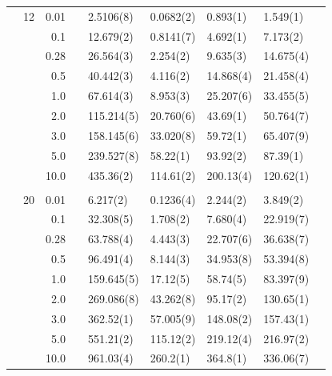 \begin{table}[H]
\begin{tabularx}{\textwidth}{R{1cm}rrcR{2.3cm}R{2.3cm}R{2.3cm}R{2.3cm}R{1cm}}
		&12 & 0.01 && 2.5106(8) & 0.0682(2) & 0.893(1) & 1.549(1) \\
		&& 0.1 && 12.679(2) & 0.8141(7) & 4.692(1) & 7.173(2) \\
		&& 0.28 && 26.564(3) & 2.254(2) & 9.635(3) & 14.675(4) \\
		&& 0.5 && 40.442(3) & 4.116(2) & 14.868(4) & 21.458(4) \\
		&& 1.0 && 67.614(3) & 8.953(3) & 25.207(6) & 33.455(5) \\
		&& 2.0 && 115.214(5) & 20.760(6) & 43.69(1) & 50.764(7) \\
		&& 3.0 && 158.145(6) & 33.020(8) & 59.72(1) & 65.407(9) \\ 
		&& 5.0 && 239.527(8) & 58.22(1) & 93.92(2) & 87.39(1) \\
		&& 10.0 && 435.36(2) & 114.61(2) & 200.13(4) & 120.62(1) \\
		\hdashline \\
		
		&20 & 0.01 && 6.217(2) & 0.1236(4) & 2.244(2) & 3.849(2) \\
		&& 0.1 && 32.308(5) & 1.708(2) & 7.680(4) & 22.919(7) \\
		&& 0.28 && 63.788(4) & 4.443(3) & 22.707(6) & 36.638(7) \\
		&& 0.5 && 96.491(4) & 8.144(3) & 34.953(8) & 53.394(8) \\
		&& 1.0 && 159.645(5) & 17.12(5) & 58.74(5) & 83.397(9) \\
		&& 2.0 && 269.086(8) & 43.262(8) & 95.17(2) & 130.65(1) \\
		&& 3.0 && 362.52(1) & 57.005(9) & 148.08(2) & 157.43(1) \\ 
		&& 5.0 && 551.21(2) & 115.12(2) & 219.12(4) & 216.97(2) \\
		&& 10.0 && 961.03(4) & 260.2(1) & 364.8(1) & 336.06(7) \\
		\hline \hline
	\end{tabularx}
\end{table} 

